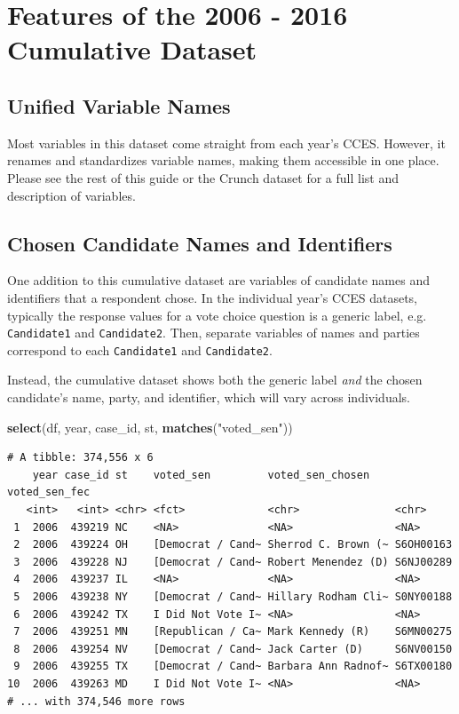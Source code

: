 \documentclass[10pt,article,oneside]{memoir}
\theoremstyle{definition}
\newenvironment{Shaded}{\begin{snugshade}}{\end{snugshade}}
\newcommand{\KeywordTok}[1]{\textcolor[rgb]{0.13,0.29,0.53}{\textbf{#1}}}
\newcommand{\StringTok}[1]{\textcolor[rgb]{0.31,0.60,0.02}{#1}}
\newcommand{\NormalTok}[1]{#1}
\begin{document}
\section{Features of the 2006 - 2016 Cumulative
Dataset}\label{features-of-the-2006---2016-cumulative-dataset}

\subsection{Unified Variable Names}\label{unified-variable-names}

Most variables in this dataset come straight from each year's CCES.
However, it renames and standardizes variable names, making them
accessible in one place. Please see the rest of this guide or the Crunch
dataset for a full list and description of variables.

\subsection{Chosen Candidate Names and
Identifiers}\label{chosen-candidate-names-and-identifiers}

One addition to this cumulative dataset are variables of candidate names
and identifiers that a respondent chose. In the individual year's CCES
datasets, typically the response values for a vote choice question is a
generic label, e.g. \texttt{Candidate1} and \texttt{Candidate2}. Then,
separate variables of names and parties correspond to each
\texttt{Candidate1} and \texttt{Candidate2}.

Instead, the cumulative dataset shows both the generic label \emph{and}
the chosen candidate's name, party, and identifier, which will vary
across individuals.

\begin{Shaded}
\begin{Highlighting}[]
\KeywordTok{select}\NormalTok{(df, year, case_id, st, }\KeywordTok{matches}\NormalTok{(}\StringTok{"voted_sen"}\NormalTok{))}
\end{Highlighting}
\end{Shaded}

\begin{verbatim}
# A tibble: 374,556 x 6
    year case_id st    voted_sen         voted_sen_chosen    voted_sen_fec
   <int>   <int> <chr> <fct>             <chr>               <chr>        
 1  2006  439219 NC    <NA>              <NA>                <NA>         
 2  2006  439224 OH    [Democrat / Cand~ Sherrod C. Brown (~ S6OH00163    
 3  2006  439228 NJ    [Democrat / Cand~ Robert Menendez (D) S6NJ00289    
 4  2006  439237 IL    <NA>              <NA>                <NA>         
 5  2006  439238 NY    [Democrat / Cand~ Hillary Rodham Cli~ S0NY00188    
 6  2006  439242 TX    I Did Not Vote I~ <NA>                <NA>         
 7  2006  439251 MN    [Republican / Ca~ Mark Kennedy (R)    S6MN00275    
 8  2006  439254 NV    [Democrat / Cand~ Jack Carter (D)     S6NV00150    
 9  2006  439255 TX    [Democrat / Cand~ Barbara Ann Radnof~ S6TX00180    
10  2006  439263 MD    I Did Not Vote I~ <NA>                <NA>         
# ... with 374,546 more rows
\end{verbatim}
\end{document}
